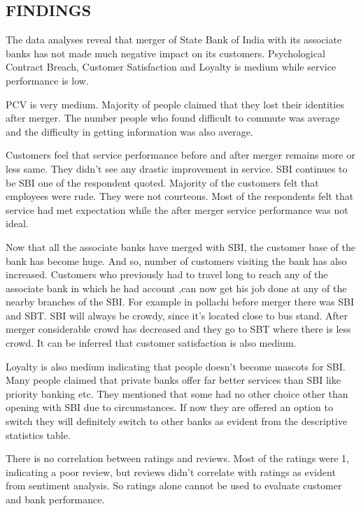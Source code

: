 \documentclass[a4paper, 12pt]{extarticle}
\begin{document}
{\subsection{FINDINGS}
The data analyses reveal that merger of State Bank of India with its associate banks has not made much negative impact on its customers. Psychological Contract Breach, Customer Satisfaction and Loyalty is medium while service performance is low.

PCV is very medium. Majority of people claimed that they lost their identities after merger. The number people who found difficult to commute was average and the difficulty in getting information was also average.

Customers feel that service performance before and after merger remains more or less same. They didn't see any drastic improvement in service. SBI continues to be SBI one of the respondent quoted. Majority of the customers felt that employees were rude. They were not courteous. Most of the respondents felt that service had met expectation while the after merger service performance was not ideal.

Now that all the associate banks have merged with SBI, the customer base of the bank has become huge. And so, number of customers visiting the bank has also increased. Customers who previously had to travel long to reach any of the associate bank in which he had account ,can now get his job done at any of the nearby branches of the SBI. For example in pollachi before merger there was SBI and SBT. SBI will always be crowdy, since it's located close to bus stand. After merger considerable crowd has decreased and they go to SBT where there is less crowd. It can be inferred that customer satisfaction is also medium.

Loyalty is also medium indicating that people doesn't become mascots for SBI. Many people claimed that private banks offer far better services than SBI like priority banking etc. They mentioned that some had no other choice other than opening with SBI due to circumstances. If now they are offered an option to switch they will definitely switch to other banks as evident from the descriptive statistics table.

There is no correlation between ratings and reviews. Most of the ratings were 1, indicating a poor review, but reviews didn't correlate with ratings as evident from sentiment analysis. So ratings alone cannot be used to evaluate customer and bank performance.

}
\end{document}
